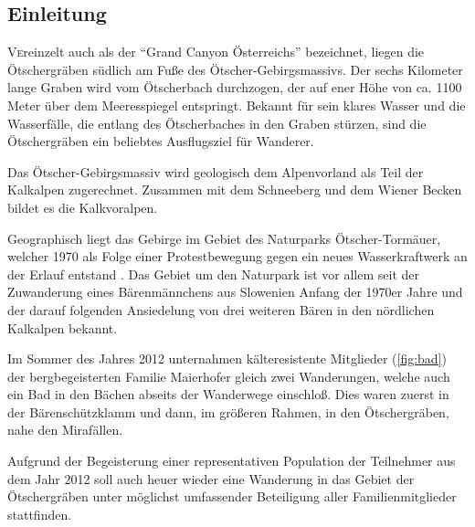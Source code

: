 \documentclass[twoside]{article}
\begin{document}
\begin{multicols}{2} %

\section{Einleitung}

\lettrine[nindent=0em,lines=3]{V} ereinzelt auch als der ``Grand Canyon Österreichs'' bezeichnet, liegen die Ötschergräben
südlich am Fuße des Ötscher-Gebirgsmassivs. Der sechs Kilometer lange Graben wird vom Ötscherbach durchzogen,
der auf ener Höhe von ca. 1100 Meter über dem Meeresspiegel entspringt. Bekannt für sein klares Wasser und
die Wasserfälle, die entlang des Ötscherbaches in den Graben stürzen, sind die Ötschergräben ein beliebtes
Ausflugsziel für Wanderer. 

Das Ötscher-Gebirgsmassiv wird geologisch dem Alpenvorland als Teil der
Kalkalpen zugerechnet. Zusammen mit dem Schneeberg und dem Wiener Becken bildet es die Kalkvoralpen. \cite{SH:2012}

Geographisch liegt das Gebirge im Gebiet des Naturparks Ötscher-Tormäuer, welcher 1970 als Folge einer Protestbewegung gegen ein neues Wasserkraftwerk an der Erlauf
entstand \cite{NOT:2013:Online}. Das Gebiet um den Naturpark ist vor allem seit der Zuwanderung eines Bärenmännchens aus Slowenien Anfang der 1970er Jahre und
der darauf folgenden Ansiedelung von drei weiteren Bären in den nördlichen Kalkalpen bekannt.

Im Sommer des Jahres 2012 unternahmen kälteresistente Mitglieder (\cref{fig:bad}) der
bergbegeisterten Familie Maierhofer gleich zwei Wanderungen, welche auch ein Bad in den
Bächen abseits der Wanderwege einschloß. Dies waren zuerst in der Bärenschützklamm und dann, im größeren Rahmen, in den Ötschergräben, nahe den Mirafällen.

Aufgrund der Begeisterung einer representativen Population der Teilnehmer aus dem Jahr 2012 soll auch heuer wieder eine Wanderung in das Gebiet der
Ötschergräben unter möglichst umfassender Beteiligung aller Familienmitglieder stattfinden.


\end{multicols}
\end{document}
